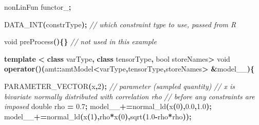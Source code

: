 \documentclass[
]{book}
\newenvironment{Shaded}{\begin{snugshade}}{\end{snugshade}}
\newcommand{\CommentTok}[1]{\textcolor[rgb]{0.56,0.35,0.01}{\textit{#1}}}
\newcommand{\DataTypeTok}[1]{\textcolor[rgb]{0.13,0.29,0.53}{#1}}
\newcommand{\DecValTok}[1]{\textcolor[rgb]{0.00,0.00,0.81}{#1}}
\newcommand{\FloatTok}[1]{\textcolor[rgb]{0.00,0.00,0.81}{#1}}
\newcommand{\KeywordTok}[1]{\textcolor[rgb]{0.13,0.29,0.53}{\textbf{#1}}}
\newcommand{\NormalTok}[1]{#1}
\newcommand{\OperatorTok}[1]{\textcolor[rgb]{0.81,0.36,0.00}{\textbf{#1}}}
\newcommand{\VariableTok}[1]{\textcolor[rgb]{0.00,0.00,0.00}{#1}}
\begin{document}
\begin{Shaded}
\begin{Highlighting}[]
\NormalTok{  nonLinFun }\VariableTok{functor\_}\OperatorTok{;}
  
\NormalTok{  DATA\_INT}\OperatorTok{(}\NormalTok{constrType}\OperatorTok{);} \CommentTok{// which constraint type to use, passed from R}
  
  \DataTypeTok{void}\NormalTok{ preProcess}\OperatorTok{()\{\}} \CommentTok{// not used in this example }
  
  \KeywordTok{template} \OperatorTok{\textless{}} \KeywordTok{class}\NormalTok{ varType}\OperatorTok{,} \KeywordTok{class}\NormalTok{ tensorType}\OperatorTok{,} \DataTypeTok{bool}\NormalTok{ storeNames}\OperatorTok{\textgreater{}}
  \DataTypeTok{void} \KeywordTok{operator}\OperatorTok{()(}\NormalTok{amt}\OperatorTok{::}\NormalTok{amtModel}\OperatorTok{\textless{}}\NormalTok{varType}\OperatorTok{,}\NormalTok{tensorType}\OperatorTok{,}\NormalTok{storeNames}\OperatorTok{\textgreater{}} \OperatorTok{\&}\NormalTok{model\_\_}\OperatorTok{)\{}
    
    
\NormalTok{    PARAMETER\_VECTOR}\OperatorTok{(}\NormalTok{x}\OperatorTok{,}\DecValTok{2}\OperatorTok{);} \CommentTok{// parameter (sampled quantity)}
    \CommentTok{// x is bivariate normally distributed with correlation rho}
    \CommentTok{// before any constraints are imposed}
    \DataTypeTok{double}\NormalTok{ rho }\OperatorTok{=} \FloatTok{0.7}\OperatorTok{;}
\NormalTok{    model\_\_}\OperatorTok{+=}\NormalTok{normal\_ld}\OperatorTok{(}\NormalTok{x}\OperatorTok{(}\DecValTok{0}\OperatorTok{),}\FloatTok{0.0}\OperatorTok{,}\FloatTok{1.0}\OperatorTok{);}
\NormalTok{    model\_\_}\OperatorTok{+=}\NormalTok{normal\_ld}\OperatorTok{(}\NormalTok{x}\OperatorTok{(}\DecValTok{1}\OperatorTok{),}\NormalTok{rho}\OperatorTok{*}\NormalTok{x}\OperatorTok{(}\DecValTok{0}\OperatorTok{),}\NormalTok{sqrt}\OperatorTok{(}\FloatTok{1.0}\OperatorTok{{-}}\NormalTok{rho}\OperatorTok{*}\NormalTok{rho}\OperatorTok{));}
    

\end{Highlighting}
\end{Shaded}
\end{document}
